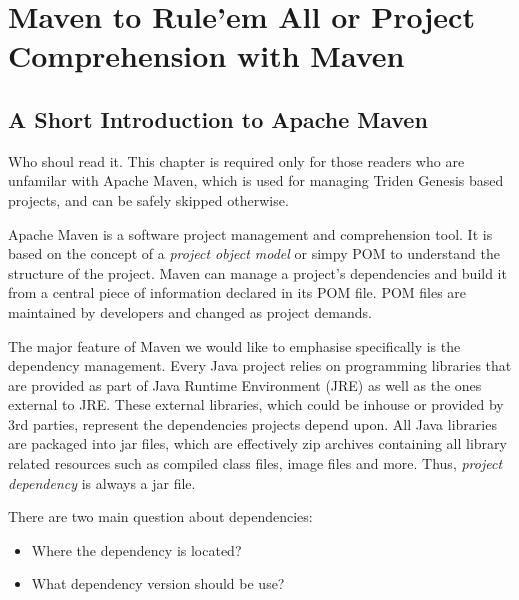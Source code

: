 \chapter{Maven to Rule'em All or Project Comprehension with Maven}\label{ch00:01}



\section{A Short Introduction to Apache Maven}

  \begin{notebox}{Who shoul read it.}{\label{mb:skip}}
    This chapter is required only for those readers who are unfamilar with Apache Maven, which is used for managing Triden Genesis based projects, and can be safely skipped otherwise.
  \end{notebox}
  
  Apache Maven is a software project management and comprehension tool. 
  It is based on the concept of a \emph{project object model} or simpy POM to understand the structure of the project. 
  Maven can manage a project's dependencies and build it from a central piece of information declared in its POM file.
  POM files are maintained by developers and changed as project demands.

  The major feature of Maven we would like to emphasise specifically is the dependency management.
  Every Java project relies on programming libraries that are provided as part of Java Runtime Environment (JRE) as well as the ones external to JRE.
  These external libraries, which could be inhouse or provided by 3rd parties, represent the dependencies projects depend upon.
  All Java libraries are packaged into jar files, which are effectively zip archives containing all library related resources such as compiled class files, image files and more.
  Thus, \emph{project dependency} is always a jar file.

  There are two main question about dependencies: 
  \begin{itemize}
    \item Where the dependency is located?
    \item What dependency version should be use?
  \end{itemize}

